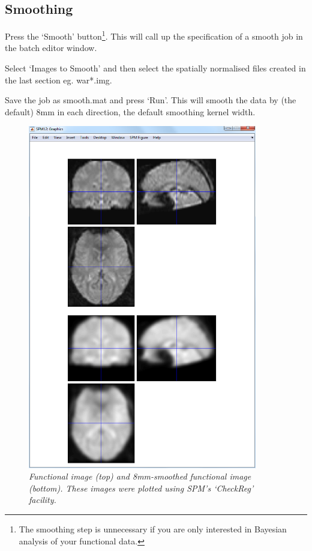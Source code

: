 \subsection{Smoothing}

Press the `Smooth' button\footnote{The smoothing step is unnecessary if you are only interested in Bayesian analysis of your functional data.}. This will call up the specification of a smooth job in the batch editor 
window.

\bi
\item{Select `Images to Smooth' and then 
select the spatially normalised files created in the 
last section eg. {\sf war*.img}. }
\item{Save the job as {\sf smooth.mat} and press `Run'.}
\ei
This will smooth the data by (the default) 8mm in each direction, 
the default smoothing kernel width.
\begin{figure}
\begin{center}
\includegraphics[width=100mm]{faces/smooth}
\caption{\em Functional image (top) and 8mm-smoothed functional image (bottom). These images were plotted using SPM's `CheckReg' facility. \label{face_smooth}}
\end{center}
\end{figure}

